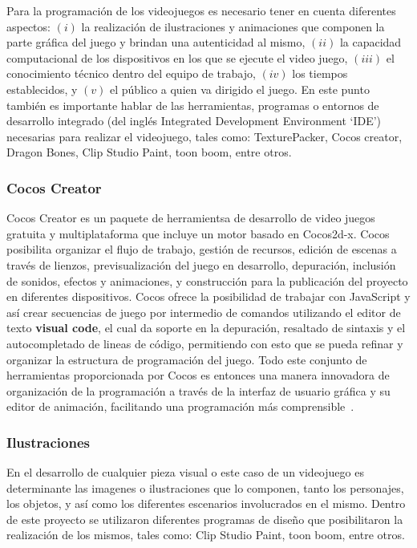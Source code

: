 \documentclass[journal,transmag]{IEEEtran}
\begin{document}
Para la programación de los videojuegos es necesario tener en cuenta diferentes aspectos: $(i)$ la realización de ilustraciones y animaciones que componen la parte gráfica del juego y brindan una autenticidad al mismo, $(ii)$ la capacidad computacional de los dispositivos en los que se ejecute el video juego, $(iii)$ el conocimiento técnico dentro del equipo de trabajo, $(iv)$ los tiempos establecidos, y $(v)$ el público a quien va dirigido el juego. En este punto también es importante hablar de las herramientas, programas o entornos de desarrollo integrado (del inglés Integrated Development Environment `IDE') necesarias para realizar el videojuego, tales como: TexturePacker, Cocos creator, Dragon Bones, Clip Studio Paint, toon boom, entre otros.

\subsubsection{Cocos Creator}
Cocos Creator es un paquete de herramientsa de desarrollo de video juegos gratuita y multiplataforma que incluye un motor basado en Cocos2d-x. Cocos posibilita organizar el flujo de trabajo, gestión de recursos, edición de escenas a través de lienzos, previsualización del juego en desarrollo, depuración, inclusión de sonidos, efectos y animaciones, y construcción para la publicación del proyecto en diferentes dispositivos. Cocos ofrece la posibilidad de trabajar con JavaScript y así crear secuencias de juego por intermedio de comandos utilizando el editor de texto \textbf{visual code}, el cual da soporte en la depuración, resaltado de sintaxis y el autocompletado de lineas de código, permitiendo con esto que se pueda refinar y organizar la estructura de programación del juego. Todo este conjunto de herramientas proporcionada por Cocos es entonces una manera innovadora de organización de la programación a través de la interfaz de usuario gráfica y su editor de animación, facilitando una programación más comprensible~\cite{Cocos}.

\subsubsection{Ilustraciones}
En el desarrollo de cualquier pieza visual o este caso de un videojuego es determinante las imagenes o ilustraciones que lo componen, tanto los personajes, los objetos, y así como los diferentes escenarios involucrados en el mismo. Dentro de este proyecto se utilizaron diferentes programas de diseño que posibilitaron la realización de los mismos, tales como: Clip Studio Paint, toon boom, entre otros.
\end{document}
